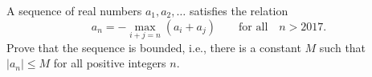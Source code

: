 A sequence of real numbers $a_1,a_2,\ldots$ satisfies the relation
$$a_n=-\max_{i+j=n}(a_i+a_j)\qquad\text{for all}\quad n>2017.$$Prove that the sequence is bounded, i.e., there is a constant $M$ such that $|a_n|\leq M$ for all positive integers $n$.